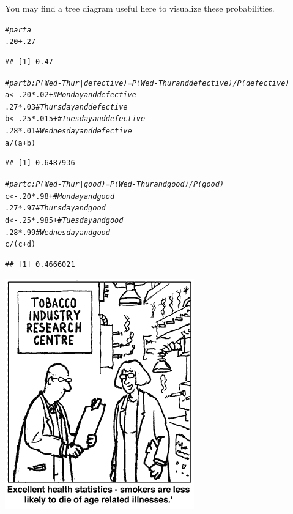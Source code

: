 \documentclass[twoside]{book}\usepackage[]{graphicx}\usepackage[]{xcolor}
\makeatletter
\newcommand{\hlnum}[1]{\textcolor[rgb]{0.686,0.059,0.569}{#1}}%
\newcommand{\hlcom}[1]{\textcolor[rgb]{0.678,0.584,0.686}{\textit{#1}}}%
\newcommand{\hlopt}[1]{\textcolor[rgb]{0,0,0}{#1}}%
\newcommand{\hlstd}[1]{\textcolor[rgb]{0.345,0.345,0.345}{#1}}%
\newcommand{\hlkwb}[1]{\textcolor[rgb]{0.69,0.353,0.396}{#1}}%
\newenvironment{kframe}{%
 \def\at@end@of@kframe{}%
 \ifinner\ifhmode%
  \def\at@end@of@kframe{\end{minipage}}%
  \begin{minipage}{\columnwidth}%
 \fi\fi%
 \def\FrameCommand##1{\hskip\@totalleftmargin \hskip-\fboxsep
 \colorbox{shadecolor}{##1}\hskip-\fboxsep
     \hskip-\linewidth \hskip-\@totalleftmargin \hskip\columnwidth}%
 \MakeFramed {\advance\hsize-\width
   \@totalleftmargin\z@ \linewidth\hsize
   \@setminipage}}%
 {\par\unskip\endMakeFramed%
 \at@end@of@kframe}
\newenvironment{knitrout}{}{} %
\makeatother
\begin{document}
\begin{solution}
You may find a tree diagram useful here to visualize these probabilities.
\begin{knitrout}
\color{fgcolor}\begin{kframe}
\begin{alltt}
\hlcom{# part a}
\hlnum{.20} \hlopt{+} \hlnum{.27}
\end{alltt}
\begin{verbatim}
## [1] 0.47
\end{verbatim}
\begin{alltt}
\hlcom{# part b: P( Wed-Thur | defective ) = P( Wed-Thur and defective ) / P(defective)}
\hlstd{a} \hlkwb{<-} \hlnum{.20} \hlopt{*} \hlnum{.02} \hlopt{+}       \hlcom{# Monday and defective}
     \hlnum{.27} \hlopt{*} \hlnum{.03}         \hlcom{# Thursday and defective}
\hlstd{b} \hlkwb{<-} \hlnum{.25} \hlopt{*} \hlnum{.015} \hlopt{+}      \hlcom{# Tuesday and defective}
     \hlnum{.28} \hlopt{*} \hlnum{.01}         \hlcom{# Wednesday and defective }
\hlstd{a} \hlopt{/} \hlstd{(a} \hlopt{+} \hlstd{b)}
\end{alltt}
\begin{verbatim}
## [1] 0.6487936
\end{verbatim}
\begin{alltt}
\hlcom{# part c: P( Wed-Thur | good ) = P( Wed-Thur and good ) / P(good)}
\hlstd{c} \hlkwb{<-} \hlnum{.20} \hlopt{*} \hlnum{.98} \hlopt{+}       \hlcom{# Monday and good}
     \hlnum{.27} \hlopt{*} \hlnum{.97}         \hlcom{# Thursday and good}
\hlstd{d} \hlkwb{<-} \hlnum{.25} \hlopt{*} \hlnum{.985} \hlopt{+}      \hlcom{# Tuesday and good}
     \hlnum{.28} \hlopt{*} \hlnum{.99}         \hlcom{# Wednesday and good }
\hlstd{c} \hlopt{/} \hlstd{(c} \hlopt{+} \hlstd{d)}
\end{alltt}
\begin{verbatim}
## [1] 0.4666021
\end{verbatim}
\end{kframe}
\end{knitrout}
\end{solution}


\shipoutProblems

\vfill

\begin{center}
	\includegraphics[width=.4\textwidth]{images/cigarettes-cartoon}
\end{center}
\end{document}

